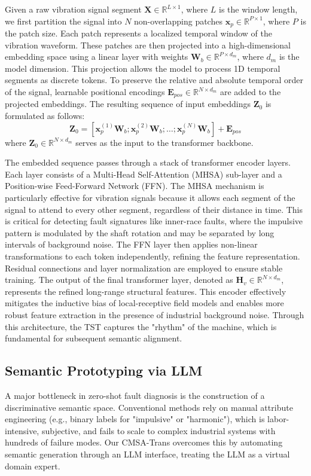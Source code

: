 Given a raw vibration signal segment $\mathbf{X} \in \mathbb{R}^{L \times 1}$, where $L$ is the window length, we first partition the signal into $N$ non-overlapping patches $\mathbf{x}_p \in \mathbb{R}^{P \times 1}$, where $P$ is the patch size. Each patch represents a localized temporal window of the vibration waveform. These patches are then projected into a high-dimensional embedding space using a linear layer with weights $\mathbf{W}_b \in \mathbb{R}^{P \times d_m}$, where $d_m$ is the model dimension. This projection allows the model to process 1D temporal segments as discrete tokens. To preserve the relative and absolute temporal order of the signal, learnable positional encodings $\mathbf{E}_{pos} \in \mathbb{R}^{N \times d_m}$ are added to the projected embeddings. The resulting sequence of input embeddings $\mathbf{Z}_0$ is formulated as follows:
\begin{equation}
\mathbf{Z}_0 = [\mathbf{x}_p^{(1)}\mathbf{W}_b; \mathbf{x}_p^{(2)}\mathbf{W}_b; \dots; \mathbf{x}_p^{(N)}\mathbf{W}_b] + \mathbf{E}_{pos}
\end{equation}
where $\mathbf{Z}_0 \in \mathbb{R}^{N \times d_m}$ serves as the input to the transformer backbone.

The embedded sequence passes through a stack of transformer encoder layers. Each layer consists of a Multi-Head Self-Attention (MHSA) sub-layer and a Position-wise Feed-Forward Network (FFN). The MHSA mechanism is particularly effective for vibration signals because it allows each segment of the signal to attend to every other segment, regardless of their distance in time. This is critical for detecting fault signatures like inner-race faults, where the impulsive pattern is modulated by the shaft rotation and may be separated by long intervals of background noise. The FFN layer then applies non-linear transformations to each token independently, refining the feature representation. Residual connections and layer normalization are employed to ensure stable training. The output of the final transformer layer, denoted as $\mathbf{H}_v \in \mathbb{R}^{N \times d_m}$, represents the refined long-range structural features. This encoder effectively mitigates the inductive bias of local-receptive field models and enables more robust feature extraction in the presence of industrial background noise. Through this architecture, the TST captures the "rhythm" of the machine, which is fundamental for subsequent semantic alignment.

\subsection{Semantic Prototyping via LLM}
A major bottleneck in zero-shot fault diagnosis is the construction of a discriminative semantic space. Conventional methods rely on manual attribute engineering (e.g., binary labels for "impulsive" or "harmonic"), which is labor-intensive, subjective, and fails to scale to complex industrial systems with hundreds of failure modes. Our CMSA-Trans overcomes this by automating semantic generation through an LLM interface, treating the LLM as a virtual domain expert.

